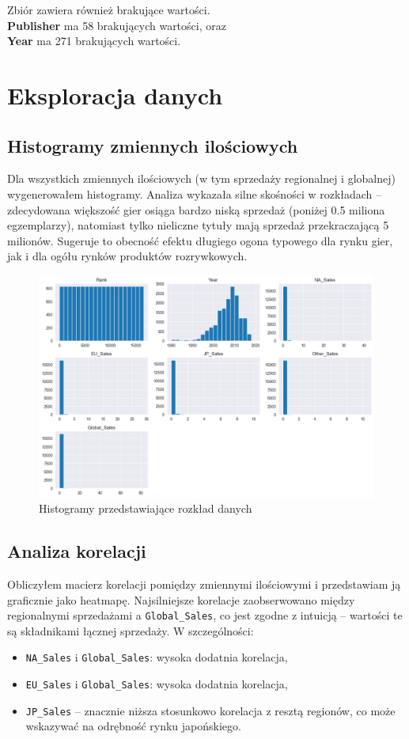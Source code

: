 \documentclass[11pt]{article}
\begin{document}
Zbiór zawiera również brakujące wartości. \\
\textbf{Publisher} ma 58 brakujących wartości, oraz \\
\textbf{Year} ma 271 brakujących wartości.

\section{Eksploracja danych}\label{sec:eksploracja-danych}

\subsection{Histogramy zmiennych ilościowych}\label{subsec:histogramy-zmiennych-ilosciowych}

Dla wszystkich zmiennych ilościowych (w tym sprzedaży regionalnej i globalnej) wygenerowałem histogramy.
Analiza wykazała silne skośności w rozkładach -- zdecydowana większość gier osiąga bardzo niską sprzedaż (poniżej 0.5 miliona egzemplarzy),
natomiast tylko nieliczne tytuły mają sprzedaż przekraczającą 5 milionów.
Sugeruje to obecność efektu długiego ogona typowego dla rynku gier, jak i dla ogółu rynków produktów rozrywkowych.

\begin{figure}[H]
    \centering
    \includegraphics[width=0.5\linewidth]{figures/histogramy}
    \caption{Histogramy przedstawiające rozkład danych}
    \label{fig:histogramy}
\end{figure}

\subsection{Analiza korelacji}\label{subsec:analiza-korelacji}

Obliczyłem macierz korelacji pomiędzy zmiennymi ilościowymi i przedstawiam ją graficznie jako heatmapę.
Najsilniejsze korelacje zaobserwowano między regionalnymi sprzedażami a \texttt{Global\_Sales},
co jest zgodne z intuicją – wartości te są składnikami łącznej sprzedaży.
W szczególności:
\begin{itemize}
  \item \texttt{NA\_Sales} i \texttt{Global\_Sales}: wysoka dodatnia korelacja,
  \item \texttt{EU\_Sales} i \texttt{Global\_Sales}: wysoka dodatnia korelacja,
  \item \texttt{JP\_Sales} – znacznie niższa stosunkowo korelacja z resztą regionów, co może wskazywać na odrębność rynku japońskiego.
\end{itemize}
\end{document}
